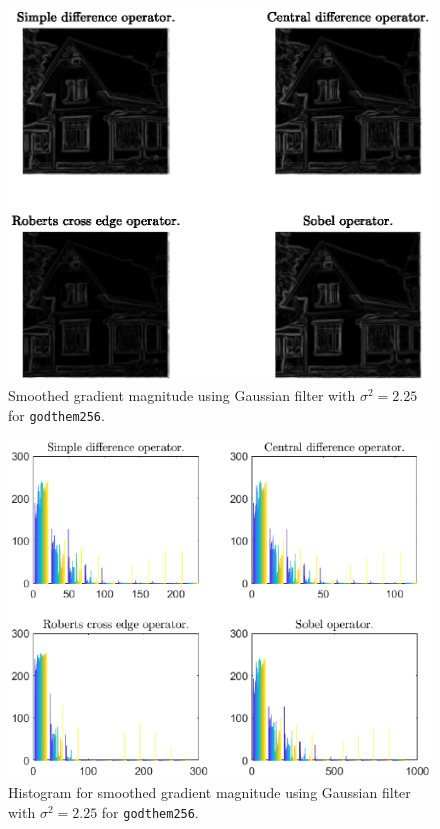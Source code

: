 \documentclass[11pt,a4paper]{article}
\begin{document}
\begin{itemize}
\begin{figure}[!ht]
			\label{fig:Question_2_Tools_Gaussian_2-25_Threshold}
		\end{figure}
		\begin{figure}[!ht]
			\centering
			\includegraphics[width=0.9\columnwidth]{Question_2_House_Gaussian_2-25.eps}
			\caption{Smoothed gradient magnitude using Gaussian filter with $\sigma^{2}=2.25$ for \texttt{godthem256}.}
			\label{fig:Question_2_House_Gaussian_2-25}
		\end{figure}
		\begin{figure}[!ht]
			\centering
			\includegraphics[width=0.9\columnwidth]{Question_2_House_Gaussian_2-25_Hist.eps}
			\caption{Histogram for smoothed gradient magnitude using Gaussian filter with $\sigma^{2}=2.25$ for \texttt{godthem256}.}

\end{figure}
\end{itemize}
\end{document}
